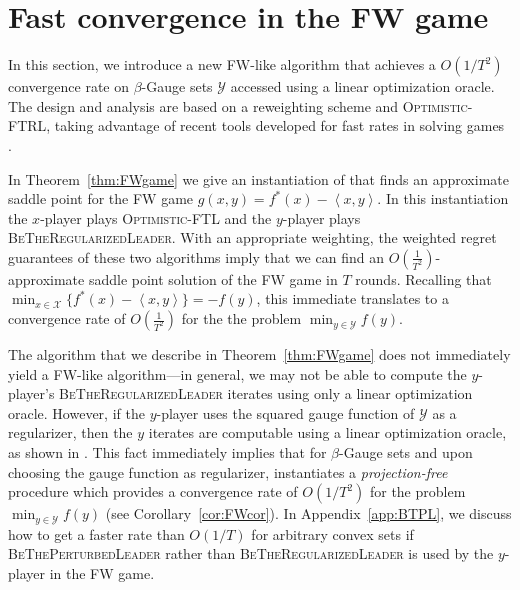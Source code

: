 \documentclass[final,12pt]{colt2018} %
\def\BTRL{\textsc{BeTheRegularizedLeader}\xspace}
\def\BTPL{\textsc{BeThePerturbedLeader}\xspace}
\def\OFTRL{\textsc{Optimistic-FTRL}\xspace}
\def\OFTL{\textsc{Optimistic-FTL}\xspace}
\newcommand{\lr}[2]{\left\langle#1,#2\right\rangle}
\newcommand{\XX}{\mathcal{X}}
\newcommand{\YY}{\mathcal{Y}}
\begin{document}

\section{Fast convergence in the FW game}\label{sec:fastfw}
In this section, we introduce a new FW-like algorithm that achieves a $O(1/T^2)$ convergence rate on $\beta$-Gauge  sets $\YY$ accessed using a linear optimization oracle. The design and analysis are based on a reweighting scheme and \OFTRL, taking advantage of recent tools developed for fast rates in solving games \citep{CJ12,RS13,SALS15}.

In Theorem~\ref{thm:FWgame} we give an instantiation of  that finds an approximate saddle point for the FW game $g(x,y) = f^*(x) - \lr{x}{y}$. In this  instantiation  the $x$-player plays 
\OFTL and the $y$-player plays \BTRL. With an appropriate weighting, the weighted regret guarantees of these two algorithms imply that we can find an $O(\frac{1}{T^2})$-approximate saddle point solution of the FW game in $T$ rounds.
Recalling that $\min_{x\in\XX}\{ f^*(x) - \lr{x}{y}\} = -f(y)$,  this 
  immediate translates to a convergence rate of  $O(\frac{1}{T^2})$ for the the problem $\min_{y\in\YY}f(y)$.





The algorithm that we describe in 
Theorem~\ref{thm:FWgame} does not immediately yield a FW-like algorithm---in general, we may not be able to compute the $y$-player's \BTRL iterates using only a linear optimization oracle. However, if the $y$-player uses the squared gauge function of $\YY$ as a regularizer, then the $y$ iterates are computable using a linear optimization oracle, as shown in . This fact immediately implies that for $\beta$-Gauge sets
and upon choosing the gauge function as regularizer,  instantiates a \emph{projection-free} procedure which provides a convergence rate of $O(1/T^2)$ for the problem  $\min_{y\in\YY}f(y)$ (see Corollary~\ref{cor:FWcor}).
In Appendix~\ref{app:BTPL}, we discuss how to get a faster rate than $O(1/T)$ for arbitrary convex sets if \BTPL rather than \BTRL is used by the $y$-player in the FW game.
\end{document}
